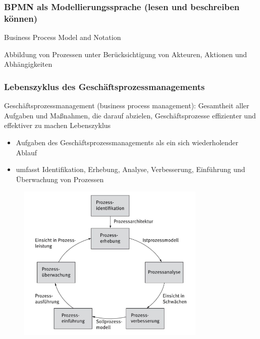 \subsubsection{BPMN als Modellierungssprache (lesen und beschreiben können)}
Business Process Model and Notation
\par
Abbildung von Prozessen unter Berücksichtigung von Akteuren, Aktionen und Abhängigkeiten

\subsubsection{Lebenszyklus des Geschäftsprozessmanagements}
Geschäftsprozessmanagement (business process management): Gesamtheit aller Aufgaben und Maßnahmen, die darauf abzielen, Geschäftsprozesse effizienter und effektiver zu machen
Lebenszyklus
\begin{itemize}
  \item Aufgaben des Geschäftsprozessmanagements als ein sich wiederholender Ablauf
  \item umfasst Identifikation, Erhebung, Analyse, Verbesserung, Einführung und Überwachung von Prozessen
\end{itemize}

\begin{figure}[htp]
\begin{center}
\includegraphics[width=0.8\textwidth]{assets/LebenszyklusGPM.PNG}
\end{center}
\end{figure}

